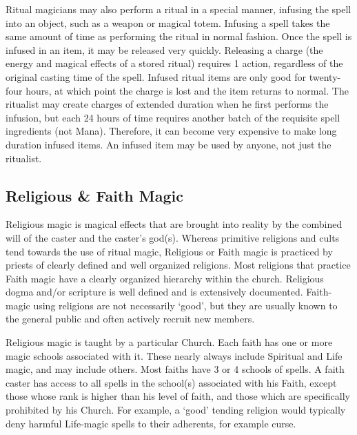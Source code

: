 \documentclass[twoside]{book}
\begin{document}
    {  
      Ritual magicians may also perform a ritual in a
               special manner, infusing the spell into an object, such as
               a weapon or magical totem. Infusing a spell takes the same
               amount of time as performing the ritual in normal fashion.
               Once the spell is infused in an item, it may be released
               very quickly. Releasing a charge (the energy and magical
               effects of a stored ritual) requires 1 action, regardless
               of the original casting time of the spell. Infused ritual
               items are only good for twenty-four hours, at which point
               the charge is lost and the item returns to normal. The
               ritualist may create charges of extended duration when he
               first performs the infusion, but each 24 hours of time
               requires another batch of the requisite spell ingredients
               (not Mana). Therefore, it can become very expensive to
               make long duration infused items. An infused item may be
               used by anyone, not just the ritualist. 
    }
  
    

\subsection{Religious \& Faith Magic}
    
    {  
      Religious magic is magical effects that are brought
               into reality by the combined will of the caster and the
               caster's god(s). Whereas primitive religions and
               cults tend towards the use of ritual magic, Religious or
               Faith magic is practiced by priests of clearly defined and
               well organized religions. Most religions that practice
               Faith magic have a clearly organized hierarchy within the
               church. Religious dogma and/or scripture is well defined
               and is extensively documented. Faith-magic using religions
               are not necessarily `good', but they are
               usually known to the general public and often actively
               recruit new members. 
    }
  
    {  
      Religious magic is taught by a particular Church.
               Each faith has one or more magic schools associated with
               it. These nearly always include Spiritual and Life magic,
               and may include others. Most faiths have 3 or 4 schools of
               spells. A faith caster has access to all spells in the
               school(s) associated with his Faith, except those whose
               rank is higher than his level of faith, and those which
               are specifically prohibited by his Church. For example, a
               `good' tending religion would typically deny
               harmful Life-magic spells to their adherents, for example
               curse. 
    }
  
\end{document}
